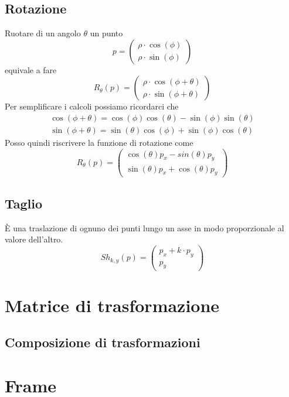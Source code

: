 \subsection{Rotazione}
Ruotare di un angolo $\theta$ un punto
\[
	p = \begin{pmatrix}
		\rho \cdot \cos(\phi) \\
		\rho \cdot \sin(\phi)
	\end{pmatrix}\]
equivale a fare
\[
	R_\theta(p) =
	\begin{pmatrix}
		\rho \cdot \cos(\phi + \theta) \\
		\rho \cdot \sin(\phi + \theta)
	\end{pmatrix}
\]
Per semplificare i calcoli possiamo ricordarci che
\begin{gather*}
	\cos(\phi + \theta) = \cos(\phi) \cos(\theta) - \sin(\phi) \sin(\theta) \\
	\sin(\phi + \theta) = \sin(\theta) \cos(\phi) + \sin(\phi) \cos(\theta)
\end{gather*}
Posso quindi riscrivere la funzione di rotazione come
\[
	R_\theta(p) =
	\begin{pmatrix}
		\cos(\theta)p_x - sin(\theta)p_y \\
		\sin(\theta)p_x + \cos(\theta)p_y
	\end{pmatrix}
\]

\subsection{Taglio}
\`E una traslazione di ognuno dei punti lungo un asse in modo proporzionale al valore
dell'altro.
\[
	Sh_{k, y}(p) =
	\begin{pmatrix}
		p_x + k \cdot p_y \\
		p_y
	\end{pmatrix}
\]

\section{Matrice di trasformazione}


\subsection{Composizione di trasformazioni}


\section{Frame}
